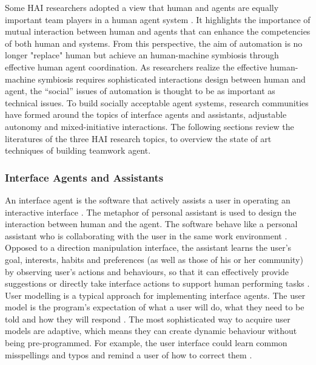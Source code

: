 Some HAI researchers adopted a view that human and agents are equally important team players in a human agent system \cite{Sukthankara}. It highlights the importance of mutual interaction between human and agents that can enhance the competencies of both human and systems. From this perspective, the aim of automation is no longer "replace" human but achieve an human-machine symbiosis through effective human agent coordination. As researchers realize the effective human-machine symbiosis requires sophisticated interactions design between human and agent, the ``social'' issues of automation is thought to be as important as technical issues\cite{Bradshaw2011}. To build socially acceptable agent systems, research communities have formed around the topics of interface agents and assistants, adjustable autonomy and mixed-initiative interactions. The following sections review the literatures of the three HAI research topics, to overview the state of art techniques of building teamwork agent. 

\subsubsection{Interface Agents and Assistants}\label{sec:lrinterfaceagent}
An interface agent is the software that actively assists a user in operating an interactive interface \cite{Lieberman2003}. The metaphor of personal assistant is used to design the interaction between human and the agent. The software behave like a personal assistant who is collaborating with the user in the same work environment \cite{Lieberman1997}. Opposed to a direction manipulation interface, the assistant learns the user's goal, interests, habits and preferences (as well as those of his or her community) by observing user's actions and behaviours,  so that it can effectively provide suggestions or directly take interface actions to support human performing tasks \cite{Maes1994}.\\

User modelling is a typical approach for implementing interface agents. The user model is the program's expectation of what a user will do, what they need to be told and how they will respond \cite{Lieberman2003}.  The most sophisticated way to acquire user models are adaptive, which means they can create dynamic behaviour without being pre-programmed. For example, the user interface could learn common misspellings and typos and remind a user of how to correct them \cite{Lieberman2003}.\\

